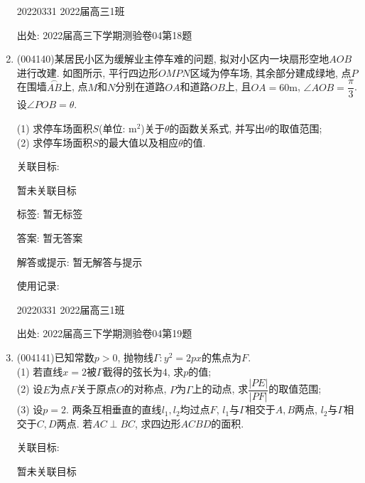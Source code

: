 \documentclass[10pt,a4paper]{article}
\begin{document}
\begin{enumerate}[1.]
20220331	2022届高三1班		


出处: 2022届高三下学期测验卷04第18题
\item { (004140)}某居民小区为缓解业主停车难的问题, 拟对小区内一块扇形空地$AOB$进行改建. 如图所示, 平行四边形$OMPN$区域为停车场, 其余部分建成绿地, 点$P$在围墙$\overset\frown{AB}$上, 点$M$和$N$分别在道路$OA$和道路$OB$上, 且$OA=60\text{m}$, $\angle AOB=\dfrac\pi 3$. 设$\angle POB=\theta$.
\begin{center}
\end{center}
(1) 求停车场面积$S$(单位: $\text{m}^2$)关于$\theta$的函数关系式, 并写出$\theta$的取值范围;\\
(2) 求停车场面积$S$的最大值以及相应$\theta$的值.


关联目标:

暂未关联目标



标签: 暂无标签

答案: 暂无答案

解答或提示: 暂无解答与提示

使用记录:

20220331	2022届高三1班		


出处: 2022届高三下学期测验卷04第19题
\item { (004141)}已知常数$p>0$, 抛物线$\Gamma:y^2=2px$的焦点为$F$.\\
(1) 若直线$x=2$被$\Gamma$截得的弦长为$4$, 求$p$的值;\\
(2) 设$E$为点$F$关于原点$O$的对称点, $P$为$\Gamma$上的动点, 求$\dfrac{|PE|}{|PF|}$的取值范围;\\
(3) 设$p=2$. 两条互相垂直的直线$l_1,l_2$均过点$F$, $l_1$与$\Gamma$相交于$A,B$两点, $l_2$与$\Gamma$相交于$C,D$两点. 若$AC\perp BC$, 求四边形$ACBD$的面积.


关联目标:

暂未关联目标




\end{enumerate}
\end{document}
